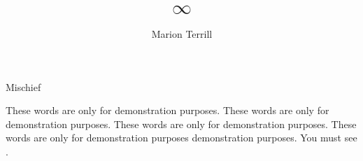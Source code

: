 \documentclass{grattan}
\title{\(\infty\)}
\author{Marion Terrill}
\begin{document}
\lipsum[1-5]

\begin{table}
\caption{Mischief}\label{tbl:example}
\vspace{11\baselineskip}
\end{table}

\lipsum[1-6]

These words are only for demonstration purposes. These words are only for demonstration purposes. These words are only for demonstration purposes. These words are only for demonstration purposes demonstration purposes. %
 You must see .%

\lipsum[1-5]

\lipsum


\nocite{ABS2009Researchexperimentaldevelopmenta}
\printbibliography
\end{document}
